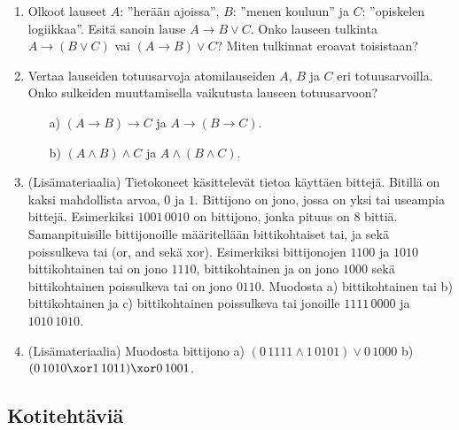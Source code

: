 \begin{enumerate}
\item Olkoot lauseet $A$: ''herään ajoissa'', $B$: ''menen kouluun'' ja $C$: ''opiskelen logiikkaa''.
Esitä sanoin lause $A \to B \lor C$. Onko lauseen tulkinta $A \to (B \lor C)$ vai $(A \to B) \lor C$? Miten tulkinnat eroavat toisistaan? 

\item
Vertaa lauseiden totuusarvoja atomilauseiden $A$, $B$ ja $C$ eri totuusarvoilla. Onko sulkeiden muuttamisella vaikutusta lauseen totuusarvoon?
\begin{itemize}
\item[a)] $(A\to B)\to C$ ja $A\to (B\to C)$.
\item[b)] $(A\land B)\land C$ ja $A\land (B\land C)$.
\end{itemize}

\item (Lisämateriaalia)  Tietokoneet käsittelevät tietoa käyttäen bittejä. Bitillä on kaksi mahdollista arvoa, $0$ ja $1$.
Bittijono on jono, jossa on yksi tai useampia bittejä. Esimerkiksi $1001\, 0010$ on bittijono, jonka pituus on $8$ bittiä. Samanpituisille bittijonoille määritellään bittikohtaiset tai, ja sekä poissulkeva tai (or, and sekä xor). Esimerkiksi bittijonojen $1100$ ja $1010$ bittikohtainen tai on jono $1110$, bittikohtainen ja on jono $1000$ sekä bittikohtainen poissulkeva tai on jono $0110$. Muodosta a) bittikohtainen tai  b) bittikohtainen ja c) bittikohtainen poissulkeva tai jonoille $1111\, 0000$ ja $1010\, 1010$.

\item (Lisämateriaalia)  Muodosta bittijono a)  $(0\, 1111 \land 1\, 0101) \lor 0\, 1000$  b) $(0\, 1010 \xor 1\, 1011) \xor 0\, 1001$. 

\end{enumerate}

\subsection*{Kotitehtäviä}

